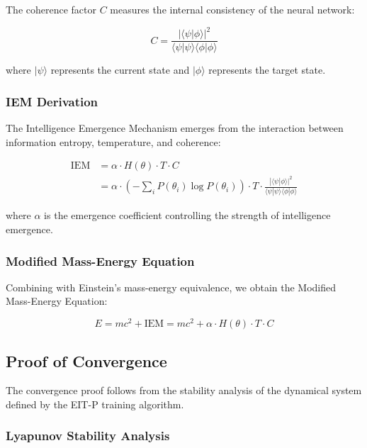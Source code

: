 \documentclass[12pt]{article}
\begin{document}
The coherence factor $C$ measures the internal consistency of the neural network:

\begin{equation}
C = \frac{|\langle \psi | \phi \rangle|^2}{\langle \psi | \psi \rangle \langle \phi | \phi \rangle}
\end{equation}

where $|\psi\rangle$ represents the current state and $|\phi\rangle$ represents the target state.

\subsubsection{IEM Derivation}

The Intelligence Emergence Mechanism emerges from the interaction between information entropy, temperature, and coherence:

\begin{align}
\text{IEM} &= \alpha \cdot H(\theta) \cdot T \cdot C \\
&= \alpha \cdot \left(-\sum_{i} P(\theta_i) \log P(\theta_i)\right) \cdot T \cdot \frac{|\langle \psi | \phi \rangle|^2}{\langle \psi | \psi \rangle \langle \phi | \phi \rangle}
\end{align}

where $\alpha$ is the emergence coefficient controlling the strength of intelligence emergence.

\subsubsection{Modified Mass-Energy Equation}

Combining with Einstein's mass-energy equivalence, we obtain the Modified Mass-Energy Equation:

\begin{equation}
E = mc^2 + \text{IEM} = mc^2 + \alpha \cdot H(\theta) \cdot T \cdot C
\end{equation}

\subsection{Proof of Convergence}

The convergence proof follows from the stability analysis of the dynamical system defined by the EIT-P training algorithm.

\subsubsection{Lyapunov Stability Analysis}
\end{document}
